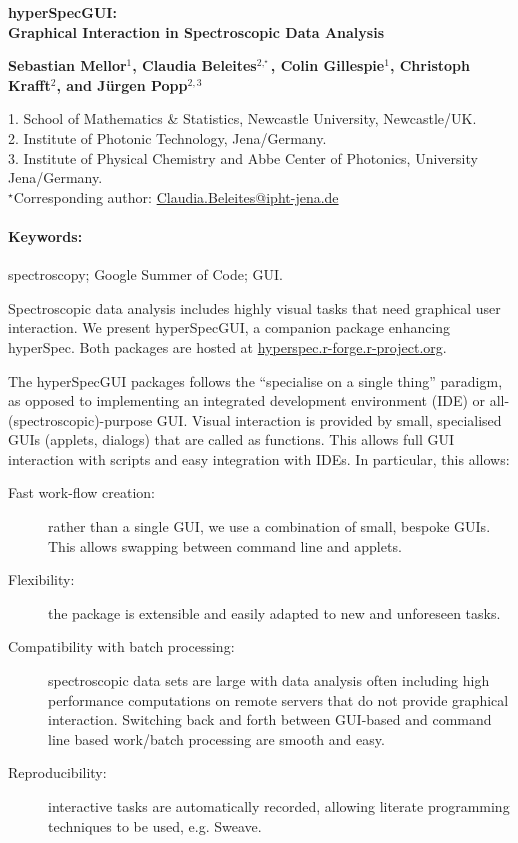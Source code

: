 \documentclass[11pt, a4paper]{article}
\newcommand{\pkg}[1]{{\normalfont\fontseries{b}\selectfont #1}}
\renewcommand{\title}[1]{\begin{center}{\bf \LARGE #1}\end{center}}
\newcommand{\keywords}{\paragraph{Keywords:}}
\begin{document}
\pagestyle{empty}

\title{\pkg{hyperSpecGUI}: \\Graphical Interaction in Spectroscopic Data Analysis}

\begin{center}
  \textbf{Sebastian Mellor$^1$, Claudia Beleites$^{2,^\star}$, Colin Gillespie$^1$, Christoph Krafft$^{2}$,
    and Jürgen Popp$^{2,3}$}
\end{center}

\begin{affiliations}
  1. School of Mathematics \& Statistics, Newcastle University, Newcastle/UK.\\[-2pt]
  2. Institute of Photonic Technology, Jena/Germany.\\[-2pt]
  3. Institute of Physical Chemistry and Abbe Center of Photonics, University Jena/Germany.\\[-2pt]
  $^\star$Corresponding author:
  \href{mailto:Claudia.Beleites@ipht-jena.de}{Claudia.Beleites@ipht-jena.de}
\end{affiliations}

\keywords spectroscopy; Google Summer of Code; GUI.

\vskip 0.8cm

Spectroscopic data analysis includes highly visual tasks that need graphical
user interaction. We present \pkg{hyperSpecGUI}, a companion package enhancing
\pkg{hyperSpec}. Both packages are hosted at
\href{http://hyperspec.r-forge.r-project.org/}{hyperspec.r-forge.r-project.org}.


The \pkg{hyperSpecGUI} packages follows the ``specialise on a single thing''
paradigm, as opposed to implementing an integrated development environment (IDE)
or all-(spectroscopic)-purpose GUI. Visual interaction is provided by small,
specialised GUIs (applets, dialogs) that are called as functions. This allows
full GUI interaction with scripts and easy integration with IDEs. In particular,
this allows:
\begin{description}
\item[Fast work-flow creation:] rather than a single GUI, we use a combination
  of small, bespoke GUIs. This allows swapping between command line and applets.
\item[Flexibility:] the package is extensible and easily adapted to new and
  unforeseen tasks.
\item[Compatibility with batch processing:] spectroscopic data sets are large
  with data analysis often including high performance computations on remote
  servers that do not provide graphical interaction. Switching back and forth
  between GUI-based and command line based work/batch processing are smooth and
  easy.
\item[Reproducibility:] interactive tasks are automatically recorded, allowing
  literate programming techniques to be used, e.g. Sweave.
\end{description}
\end{document}
